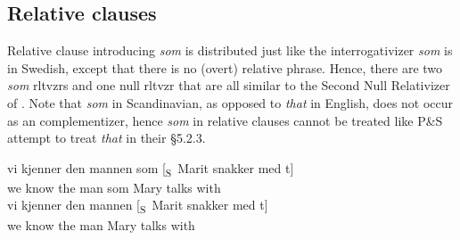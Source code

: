 \documentclass[output=paper]{LSP/langsci}
\begin{document}
\subsection{Relative clauses}

\randnum\label{rn:15-22}Relative clause introducing \textit{som} is distributed just like the
interrogativizer \textit{som} is in Swedish, except that there is no (overt)
relative phrase. Hence, there are two \textit{som} rltvzrs and one null rltvzr
that are all similar to the Second Null Relativizer of \citet[222 (36)]{PollardSag1994}. Note that \textit{som} in Scandinavian, as opposed to \textit{that} in English,
does not occur as an  complementizer, hence \textit{som} in
relative clauses cannot be treated like P\&S attempt to treat \textit{that} in their §5.2.3.


\eal%
\settowidth{}
\label{ex:15-11}
\zl
\largerpage[2]
\eal%
\settowidth{}
\label{ex:15-12}
\ex%
\label{ex:15-12a}
\gll
vi kjenner den mannen som [\textsubscript{S}~Marit snakker med t] \\
we know the man som \hphantom{[\textsubscript{S}~}Mary talks with \\
\ex%
\label{ex:15-12b}
\gll
vi kjenner den mannen [\textsubscript{S}~Marit snakker med t] \\
we know the man \hphantom{[\textsubscript{S}~}Mary talks with \\
\zl
\end{document}
